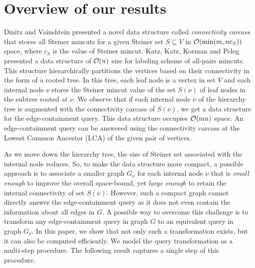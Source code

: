\noindent


\section{Overview of our results} 

Dinitz and Vainshtein \cite{DBLP:journals/siamcomp/DinitzV00}
presented a novel data structure called {\em connectivity carcass} that stores all Steiner mincuts for a given Steiner set $S\subseteq V$ in ${\cal O}(\min(m,nc_S))$ space, where $c_S$ is the value of Steiner mincut. %
Katz, Katz, Korman and Peleg \cite{DBLP:journals/siamcomp/KatzKKP04} presented a data structure of ${\cal O}(n)$ size for labeling scheme of all-pairs mincuts. This structure hierarchically partitions the vertices based on their connectivity in the form of a rooted tree. In this tree, each leaf node is a vertex in set $V$ and each internal node $\nu$ stores the Steiner mincut value of the set $S(\nu)$ of leaf nodes in the subtree rooted at $\nu$. %
We observe that if each internal node $\nu$ of the hierarchy tree
is augmented with the connectivity carcass of $S(\nu)$, we get a data structure for the edge-containment query. This data structure occupies ${\cal O}(mn)$ space. An edge-containment query can be answered using the connectivity carcass at the Lowest Common Ancestor (LCA) of the given pair of vertices.

As we move down the hierarchy tree, the size of Steiner set associated with the internal node reduces. So, to make the data structure more compact, a possible approach is to associate a smaller graph $G_\nu$ for each internal node $\nu$ that is {\em small enough} to improve the overall space-bound, yet {\em large enough} to retain the internal connectivity of set $S(\nu)$. 
However, such a compact graph cannot directly answer the edge-containment query as it does not even contain the information about all edges in $G$. A possible way to overcome this challenge is to transform any edge-containment query in graph $G$ to an equivalent query in graph $G_{\nu}$. In this paper, we show that not only such a transformation exists, but it can also be computed efficiently. We model the query transformation as a multi-step procedure. The following result captures a single step of this procedure.

